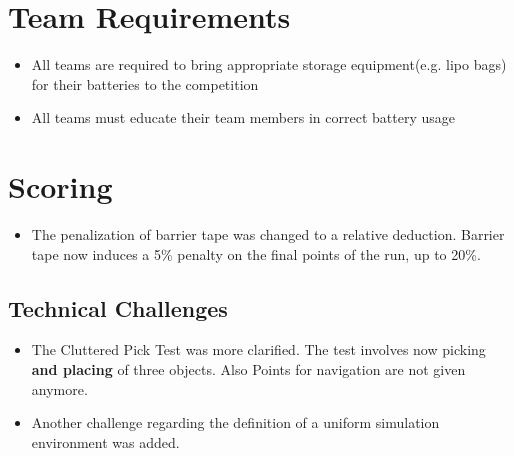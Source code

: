 \section{Team Requirements}
\begin{itemize}
  \item All teams are required to bring appropriate storage equipment(e.g. lipo bags) for their batteries to the competition
  \item All teams must educate their team members in correct battery usage 
\end{itemize}

\section{Scoring}
\begin{itemize}
  \item The penalization of barrier tape was changed to a relative deduction. Barrier tape now induces a 5\% penalty on the final points of the run, up to 20\%.
\end{itemize}

\subsection{Technical Challenges}
\begin{itemize}
  \item The Cluttered Pick Test was more clarified. The test involves now picking \textbf{and placing} of three objects. Also Points for navigation are not given anymore. 
  \item Another challenge regarding the definition of a uniform simulation environment was added.
\end{itemize}
